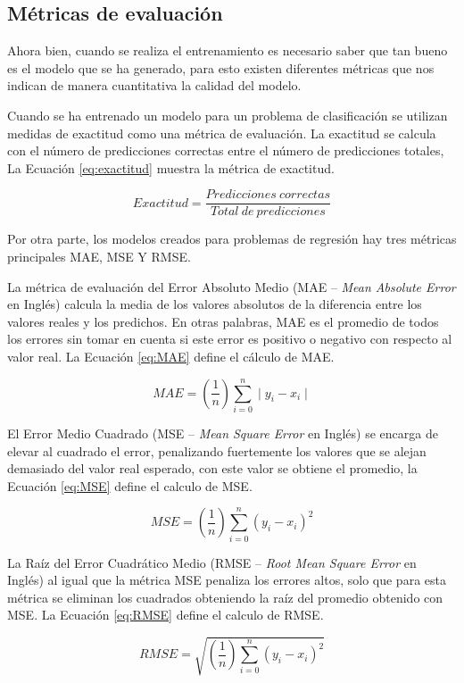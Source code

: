 \subsection{Métricas de evaluación}


Ahora bien, cuando se realiza el entrenamiento es necesario saber que tan bueno es el modelo que se ha generado, para esto existen diferentes métricas que nos indican de manera cuantitativa la calidad del modelo.

Cuando se ha entrenado un modelo para un problema de clasificación se utilizan medidas de exactitud como una métrica de evaluación. La exactitud se calcula con el número de predicciones correctas entre el número de predicciones totales, La Ecuación \ref{eq:exactitud} muestra la métrica de exactitud.

\begin{equation}
    \label{eq:exactitud}
    Exactitud = \frac{Predicciones \: correctas}{ Total \: de \: predicciones}
\end{equation}

Por otra parte, los modelos creados para problemas de regresión hay tres métricas principales MAE, MSE Y RMSE.

La métrica de evaluación del Error Absoluto Medio (MAE – \textit{Mean Absolute Error} en Inglés) calcula la media de los valores absolutos de la diferencia entre los valores reales y los predichos. En otras palabras, MAE es el promedio de todos los errores sin tomar en cuenta si este error es positivo o negativo con respecto al valor real. La Ecuación \ref{eq:MAE} define el cálculo de MAE.

\begin{equation}
    \label{eq:MAE}
    MAE = (\frac{1}{n}) \displaystyle\sum\limits_{i=0}^n \mid y_i - x_i \mid
\end{equation}

El Error Medio Cuadrado (MSE – \textit{Mean Square Error} en Inglés) se encarga de elevar al cuadrado el error, penalizando fuertemente los valores que se alejan demasiado del valor real esperado, con este valor se obtiene el promedio, la Ecuación \ref{eq:MSE} define el calculo de MSE.

\begin{equation}
    \label{eq:MSE}
    MSE = (\frac{1}{n}) \displaystyle\sum\limits_{i=0}^n (y_i - x_i)^{2}
\end{equation}

La Raíz del Error Cuadrático Medio (RMSE – \textit{Root Mean Square Error} en Inglés) al igual que la métrica MSE penaliza los errores altos, solo que para esta métrica se eliminan los cuadrados obteniendo la raíz del promedio obtenido con MSE. La Ecuación \ref{eq:RMSE} define el calculo de RMSE.

\begin{equation}
    \label{eq:RMSE}
    RMSE = \sqrt {
        (\frac{1}{n}) \displaystyle\sum\limits_{i=0}^n (y_i - x_i)^{2}
    }
\end{equation}
